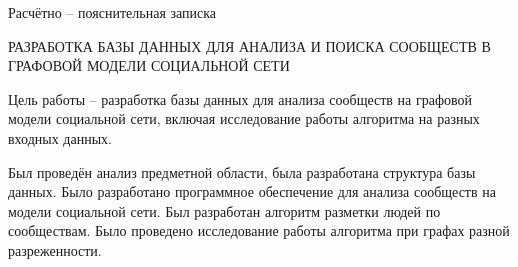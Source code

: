 
Расчётно -- пояснительная записка

РАЗРАБОТКА БАЗЫ ДАННЫХ ДЛЯ АНАЛИЗА И ПОИСКА СООБЩЕСТВ В ГРАФОВОЙ МОДЕЛИ СОЦИАЛЬНОЙ СЕТИ

Цель работы -- разработка базы данных для анализа сообществ на графовой модели социальной сети, включая исследование работы алгоритма на разных входных данных.

Был проведён анализ предметной области, была разработана структура базы данных. Было разработано программное обеспечение для анализа сообществ на модели социальной сети. Был разработан алгоритм разметки людей по сообществам. Было проведено исследование работы алгоритма при графах разной разреженности.